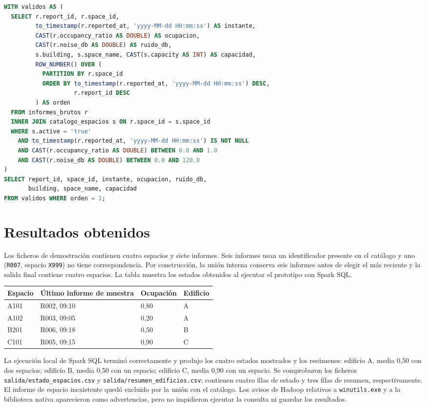 \documentclass[a4paper,12pt]{article}
\begin{document}
\begin{lstlisting}[language=SQL,caption={Selección del último informe válido y unión con el catálogo}]
WITH validos AS (
  SELECT r.report_id, r.space_id,
         to_timestamp(r.reported_at, 'yyyy-MM-dd HH:mm:ss') AS instante,
         CAST(r.occupancy_ratio AS DOUBLE) AS ocupacion,
         CAST(r.noise_db AS DOUBLE) AS ruido_db,
         s.building, s.space_name, CAST(s.capacity AS INT) AS capacidad,
         ROW_NUMBER() OVER (
           PARTITION BY r.space_id
           ORDER BY to_timestamp(r.reported_at, 'yyyy-MM-dd HH:mm:ss') DESC,
                    r.report_id DESC
         ) AS orden
  FROM informes_brutos r
  INNER JOIN catalogo_espacios s ON r.space_id = s.space_id
  WHERE s.active = 'true'
    AND to_timestamp(r.reported_at, 'yyyy-MM-dd HH:mm:ss') IS NOT NULL
    AND CAST(r.occupancy_ratio AS DOUBLE) BETWEEN 0.0 AND 1.0
    AND CAST(r.noise_db AS DOUBLE) BETWEEN 0.0 AND 120.0
)
SELECT report_id, space_id, instante, ocupacion, ruido_db,
       building, space_name, capacidad
FROM validos WHERE orden = 1;
\end{lstlisting}

\section{Resultados obtenidos}
Los ficheros de demostración contienen cuatro espacios y siete informes. Seis informes usan un identificador presente en el catálogo y uno (\texttt{R007}, espacio \texttt{X999}) no tiene correspondencia. Por construcción, la unión interna conserva seis informes antes de elegir el más reciente y la salida final contiene cuatro espacios. La tabla muestra los estados obtenidos al ejecutar el prototipo con Spark SQL.

\begin{center}\small
\begin{tabular}{llll}\toprule
Espacio & Último informe de muestra & Ocupación & Edificio\\\midrule
A101 & R002, 09:10 & 0,80 & A\\
A102 & R003, 09:05 & 0,20 & A\\
B201 & R006, 09:18 & 0,50 & B\\
C101 & R005, 09:15 & 0,90 & C\\\bottomrule
\end{tabular}\end{center}

La ejecución local de Spark SQL terminó correctamente y produjo los cuatro estados mostrados y los resúmenes: edificio A, media 0,50 con dos espacios; edificio B, media 0,50 con un espacio; edificio C, media 0,90 con un espacio. Se comprobaron los ficheros \texttt{salida/estado\_espacios.csv} y \texttt{salida/resumen\_edificios.csv}; contienen cuatro filas de estado y tres filas de resumen, respectivamente. El informe de espacio inexistente quedó excluido por la unión con el catálogo. Los avisos de Hadoop relativos a \texttt{winutils.exe} y a la biblioteca nativa aparecieron como advertencias, pero no impidieron ejecutar la consulta ni guardar los resultados.
\end{document}
